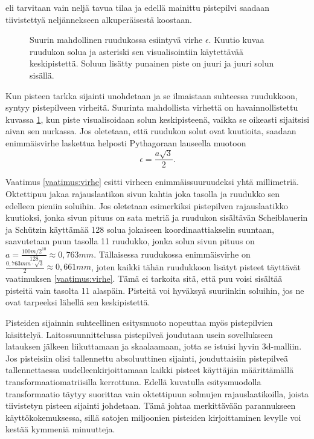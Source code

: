 
\noindent eli tarvitaan vain neljä tavua tilaa ja edellä mainittu pistepilvi saadaan tiivistettyä neljännekseen alkuperäisestä koostaan. 

\begin{figure}
    \centering
    
    \caption{Suurin mahdollinen ruudukossa esiintyvä virhe $\epsilon$. Kuutio kuvaa ruudukon solua ja asteriski sen visualisointiin käytettävää keskipistettä. Soluun lisätty punainen piste on juuri ja juuri solun sisällä.}
    \label{errorkuva}
\end{figure}

Kun pisteen tarkka sijainti unohdetaan ja se ilmaistaan suhteessa ruudukkoon, syntyy pistepilveen virheitä. Suurinta mahdollista virhettä on havainnollistettu kuvassa \ref{errorkuva}, kun piste visualisoidaan solun keskipisteenä, vaikka se oikeasti sijaitsisi aivan sen nurkassa. Jos oletetaan, että ruudukon solut ovat kuutioita, saadaan enimmäisvirhe laskettua helposti Pythagoraan lauseella muotoon 
\begin{equation}
    \epsilon = \frac{a \sqrt{3}}{2}.      
\end{equation}

Vaatimus \ref{vaatimus:virhe} esitti virheen enimmäissuuruudeksi yhtä millimetriä. Oktettipuu jakaa rajauslaatikon sivun kahtia joka tasolla ja ruudukko sen edelleen pieniin soluihin. Jos oletetaan esimerkiksi pistepilven rajauslaatikko kuutioksi, jonka sivun pituus on sata metriä ja ruudukon sisältävän Scheiblauerin ja Schützin käyttämää 128 solua jokaiseen koordinaattiakselin suuntaan, saavutetaan puun tasolla 11 ruudukko, jonka solun sivun pituus on $a = \frac{100m/2^{10}}{128} \approx 0,763mm$. Tällaisessa ruudukossa enimmäisvirhe on $\frac{0,763mm \cdot \sqrt{3}}{2} \approx 0,661mm$, joten kaikki tähän ruudukkoon lisätyt pisteet täyttävät vaatimuksen \ref{vaatimus:virhe}. Tämä ei tarkoita sitä, että puu voisi sisältää pisteitä vain tasolta 11 alaspäin. Pisteitä voi hyväksyä suuriinkin soluihin, jos ne ovat tarpeeksi lähellä sen keskipistettä.

Pisteiden sijainnin suhteellinen esitysmuoto nopeuttaa myös pistepilvien käsittelyä. Laitossuunnittelussa pistepilveä joudutaan usein sovellukseen latauksen jälkeen liikuttamaan ja skaalaamaan, jotta se istuisi hyvin 3d-malliin. Jos pisteisiin olisi tallennettu absoluuttinen sijainti, jouduttaisiin pistepilveä tallennettaessa uudelleenkirjoittamaan kaikki pisteet käyttäjän määrittämällä transformaatiomatriisilla kerrottuna. Edellä kuvatulla esitysmuodolla transformaatio täytyy suorittaa vain oktettipuun solmujen rajauslaatikoilla, joista tiivistetyn pisteen sijainti johdetaan. Tämä johtaa merkittävään parannukseen käyttökokemuksessa, sillä satojen miljoonien pisteiden kirjoittaminen levylle voi kestää kymmeniä minuutteja.

